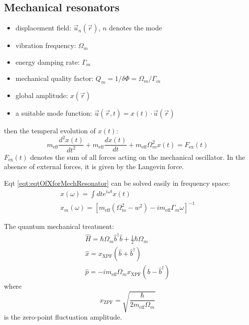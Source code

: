 \documentclass[8pt,a4paper,twocolumn]{article} %
\numberwithin{equation}{section} %
\begin{document}
		\subsection{Mechanical resonators} %
		\label{sub:mechanical_resonators}
			\begin{itemize}
				\item displacement field: $\vec{u}_n(\vec r) $, $n$ denotes the mode
				\item vibration frequency: $\Omega_m$
				\item energy damping rate: $ \Gamma_m $
				\item mechanical quality factor: $ Q_m = 1/\delta \Phi = \Omega_m/\Gamma_m $
				\item global amplitude: $x (\vec r) $
				\item a suitable mode function: $ \vec u (\vec r,t)=x(t)\cdot \vec u(\vec r) $
			\end{itemize}
			then the temperal evolution of $x(t) $:
			\begin{equation}
			\label{eqt:eqtOfXforMechResonator}
				m_{\text{eff}} \frac{d^2 x(t)}{dt^2} +m_{\text{eff}} \frac{dx(t)}{dt}+m_{\text{eff}} \Omega_m^2 x(t)=F_{\text{ex}}(t)
			\end{equation}
			$F_{\text{ex}}(t)$ denotes the sum of all forces acting on the mechanical oscillator. In the absence of external forces, it is given by the Langevin force.

			Eqt \ref{eqt:eqtOfXforMechResonator} can be solved easily in frequency space:
			\begin{gather}
				x(\omega)=\int dt e^{i \omega t} x(t)\\
				x_m(\omega)=\left[ m_{\text{eff}} \left( \Omega_m^2-w	^2 \right)-im_{\text{eff}} \Gamma_m \omega \right]^{-1}
			\end{gather}

			The quantum mechanical treatment:
			\begin{gather}
				\hat{H}=\hbar \Omega_m \hat{b}^{\dagger}\hat{b}+\frac{1}{2} \hbar \Omega_m\\
				\hat{x}=x_{\text{XPF}}(\hat{b}+\hat{b}^{\dagger})\\
				\hat{p}= -i m_{\text{eff}} \Omega_m x_{\text{XPF}}(\hat{b}-\hat{b}^{\dagger})
			\end{gather}
			where
			\begin{equation}
				x_{\text{ZPF}}=\sqrt{ \frac{\hbar}{2 m_{\text{eff}} \Omega_m } }
			\end{equation}
			is the zero-point fluctuation amplitude.
\end{document}
